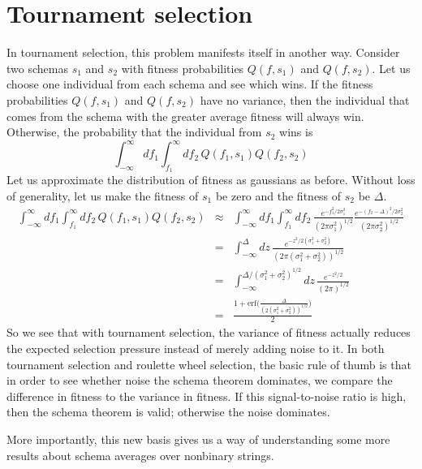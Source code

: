 \section{Tournament selection}
In tournament selection, this problem manifests itself in another way.
Consider two schemas $s_1$ and $s_2$ with fitness probabilities
$Q(f,s_1)$ and $Q(f,s_2)$.  Let us choose one individual from each schema
and see which wins.  If the fitness probabilities $Q(f,s_1)$ and
$Q(f,s_2)$ have no variance, then the individual that comes from the
schema with the greater average fitness will always win.  Otherwise, the
probability that the individual from $s_2$ wins is
\begin{equation}
\int_{-\infty}^{\infty} {df_1
\int_{f_1}^{\infty} {df_2\,
Q(f_1,s_1) Q(f_2,s_2)}}
\end{equation}
Let us approximate the distribution of fitness as gaussians as before.
Without loss of generality, let us make the fitness of $s_1$ be zero
and the fitness of $s_2$ be $\Delta$.
\begin{eqnarray}
\int_{-\infty}^{\infty} {df_1
\int_{f_1}^{\infty} {df_2\,
Q(f_1,s_1) Q(f_2,s_2)}} &\approx&
\int_{-\infty}^{\infty} {df_1
\int_{f_1}^{\infty} {df_2\,
\frac{e^{-f_1^2/2\sigma_1^2}}{(2 \pi \sigma_1^2)^{1/2}}
\frac{e^{-(f_2-\Delta)^2/2\sigma_2^2}}{(2 \pi \sigma_2^2)^{1/2}}
}} \nonumber\\
&=& \int_{-\infty}^{\Delta}{dz\, \frac{e^{-z^2/2(\sigma_1^2+\sigma_2^2)}}{
        (2 \pi(\sigma_1^2+\sigma_2^2))^{1/2}}} \nonumber\\
&=& \int_{-\infty}^{\Delta/(\sigma_1^2+\sigma_2^2)^{1/2}}{dz\,
        \frac{e^{-z^2/2}}{(2\pi)^{1/2}}} \nonumber\\
&=& \frac{
        1+\mbox{erf}
        ({\frac{\Delta}{(2(\sigma_1^2+\sigma_2^2))^{1/2}})}}{2}
\end{eqnarray}
So we see that with tournament selection, the variance of fitness actually
reduces the expected selection pressure instead of merely adding noise to it.
In both tournament selection and roulette wheel selection, the basic rule
of thumb is that in order to see whether noise the schema theorem dominates,
we compare the difference in fitness to the variance in fitness.  If this
signal-to-noise ratio is high, then the schema theorem is valid; otherwise
the noise dominates.




More importantly, this
new basis gives us a way of understanding some more results about schema
averages over nonbinary strings.

